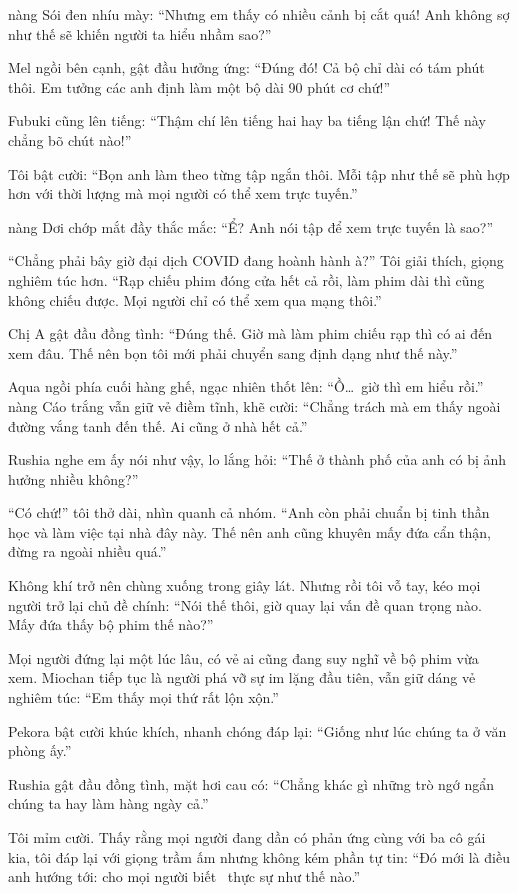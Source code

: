 \documentclass[../main.tex]{subfiles}
\begin{document}
nàng Sói đen nhíu mày: ``Nhưng em thấy có nhiều cảnh bị cắt quá! Anh không sợ như thế sẽ khiến người ta hiểu nhầm sao?''

Mel ngồi bên cạnh, gật đầu hưởng ứng: ``Đúng đó! Cả bộ chỉ dài có tám phút thôi. Em tưởng các anh định làm một bộ dài 90 phút cơ chứ!''

Fubuki cũng lên tiếng: ``Thậm chí lên tiếng hai hay ba tiếng lận chứ! Thế này chẳng bõ chút nào!''

Tôi bật cười: ``Bọn anh làm theo từng tập ngắn thôi. Mỗi tập như thế sẽ phù hợp hơn với thời lượng mà mọi người có thể xem trực tuyến.''

nàng Dơi chớp mắt đầy thắc mắc: ``Ể? Anh nói tập để xem trực tuyến là sao?''

``Chẳng phải bây giờ đại dịch COVID đang hoành hành à?'' Tôi giải thích, giọng nghiêm túc hơn. ``Rạp chiếu phim đóng cửa hết cả rồi, làm phim dài thì cũng không chiếu được. Mọi người chỉ có thể xem qua mạng thôi.''

Chị A gật đầu đồng tình: ``Đúng thế. Giờ mà làm phim chiếu rạp thì có ai đến xem đâu. Thế nên bọn tôi mới phải chuyển sang định dạng như thế này.''

Aqua ngồi phía cuối hàng ghế, ngạc nhiên thốt lên: ``Ồ\dots\ giờ thì em hiểu rồi.'' nàng Cáo trắng vẫn giữ vẻ điềm tĩnh, khẽ cười: ``Chẳng trách mà em thấy ngoài đường vắng tanh đến thế. Ai cũng ở nhà hết cả.''

Rushia nghe em ấy nói như vậy, lo lắng hỏi: ``Thế ở thành phố của anh có bị ảnh hưởng nhiều không?''

``Có chứ!'' tôi thở dài, nhìn quanh cả nhóm. ``Anh còn phải chuẩn bị tinh thần học và làm việc tại nhà đây này. Thế nên anh cũng khuyên mấy đứa cẩn thận, đừng ra ngoài nhiều quá.''

Không khí trở nên chùng xuống trong giây lát. Nhưng rồi tôi vỗ tay, kéo mọi người trở lại chủ đề chính: ``Nói thế thôi, giờ quay lại vấn đề quan trọng nào. Mấy đứa thấy bộ phim thế nào?''

Mọi người đứng lại một lúc lâu, có vẻ ai cũng đang suy nghĩ về bộ phim vừa xem. Miochan tiếp tục là người phá vỡ sự im lặng đầu tiên, vẫn giữ dáng vẻ nghiêm túc: ``Em thấy mọi thứ rất lộn xộn.''

Pekora bật cười khúc khích, nhanh chóng đáp lại: ``Giống như lúc chúng ta ở văn phòng ấy.''

Rushia gật đầu đồng tình, mặt hơi cau có: ``Chẳng khác gì những trò ngớ ngẩn chúng ta hay làm hàng ngày cả.''

Tôi mỉm cười. Thấy rằng mọi người đang dần có phản ứng cùng với ba cô gái kia, tôi đáp lại với giọng trầm ấm nhưng không kém phần tự tin: ``Đó mới là điều anh hướng tới: cho mọi người biết \hll\ thực sự như thế nào.''
\end{document}
